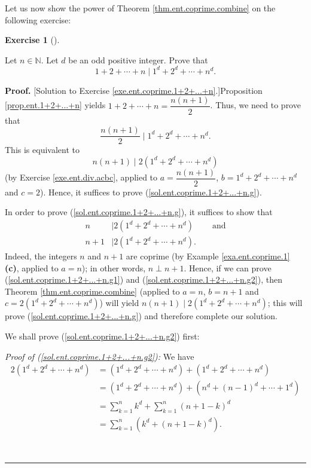 \documentclass[numbers=enddot,12pt,final,onecolumn,notitlepage]{scrartcl}%
\newcounter{exer}
\numberwithin{exer}{subsection}
\theoremstyle{definition}
\newtheorem{exmp}[exer]{Exercise}
\newenvironment{exercise}[1][]
{\begin{exmp}[#1]\begin{leftbar}}
{\end{leftbar}\end{exmp}}
\newenvironment{fineprint}{\begin{small}}{\end{small}}
\newenvironment{proof}[1][Proof]{\noindent\textbf{#1.} }{\ \rule{0.5em}{0.5em}}
\let\sumnonlimits\sum
\renewcommand{\sum}{\sumnonlimits\limits}
\begin{document}
Let us now show the power of Theorem \ref{thm.ent.coprime.combine} on the
following exercise:

\begin{exercise}
\label{exe.ent.coprime.1+2+...+n}Let $n\in\mathbb{N}$. Let $d$ be an odd
positive integer. Prove that%
\[
1+2+\cdots+n\mid1^{d}+2^{d}+\cdots+n^{d}.
\]

\end{exercise}

\begin{fineprint}
\begin{proof}
[Solution to Exercise \ref{exe.ent.coprime.1+2+...+n}.]Proposition
\ref{prop.ent.1+2+...+n} yields $1+2+\cdots+n=\dfrac{n\left(  n+1\right)  }%
{2}$. Thus, we need to prove that%
\[
\dfrac{n\left(  n+1\right)  }{2}\mid1^{d}+2^{d}+\cdots+n^{d}.
\]
This is equivalent to%
\begin{equation}
n\left(  n+1\right)  \mid2\left(  1^{d}+2^{d}+\cdots+n^{d}\right)
\label{sol.ent.coprime.1+2+...+n.g}%
\end{equation}
(by Exercise \ref{exe.ent.div.acbc}, applied to $a=\dfrac{n\left(  n+1\right)
}{2}$, $b=1^{d}+2^{d}+\cdots+n^{d}$ and $c=2$). Hence, it suffices to prove
(\ref{sol.ent.coprime.1+2+...+n.g}).

In order to prove (\ref{sol.ent.coprime.1+2+...+n.g}), it suffices to show
that%
\begin{align}
n  &  \mid2\left(  1^{d}+2^{d}+\cdots+n^{d}\right)
\ \ \ \ \ \ \ \ \ \ \text{and}\label{sol.ent.coprime.1+2+...+n.g1}\\
n+1  &  \mid2\left(  1^{d}+2^{d}+\cdots+n^{d}\right)  .
\label{sol.ent.coprime.1+2+...+n.g2}%
\end{align}
Indeed, the integers $n$ and $n+1$ are coprime (by Example
\ref{exa.ent.coprime.1} \textbf{(c)}, applied to $a=n$); in other words,
$n\perp n+1$. Hence, if we can prove (\ref{sol.ent.coprime.1+2+...+n.g1}) and
(\ref{sol.ent.coprime.1+2+...+n.g2}), then Theorem
\ref{thm.ent.coprime.combine} (applied to $a=n$, $b=n+1$ and $c=2\left(
1^{d}+2^{d}+\cdots+n^{d}\right)  $) will yield $n\left(  n+1\right)
\mid2\left(  1^{d}+2^{d}+\cdots+n^{d}\right)  $; this will prove
(\ref{sol.ent.coprime.1+2+...+n.g}) and therefore complete our solution.

We shall prove (\ref{sol.ent.coprime.1+2+...+n.g2}) first:

\textit{Proof of (\ref{sol.ent.coprime.1+2+...+n.g2}):} We have%
\begin{align}
2\left(  1^{d}+2^{d}+\cdots+n^{d}\right)   &  =\left(  1^{d}+2^{d}%
+\cdots+n^{d}\right)  +\left(  1^{d}+2^{d}+\cdots+n^{d}\right) \nonumber\\
&  =\left(  1^{d}+2^{d}+\cdots+n^{d}\right)  +\left(  n^{d}+\left(
n-1\right)  ^{d}+\cdots+1^{d}\right) \nonumber\\
&  =\sum_{k=1}^{n}k^{d}+\sum_{k=1}^{n}\left(  n+1-k\right)  ^{d}\nonumber\\
&  =\sum_{k=1}^{n}\left(  k^{d}+\left(  n+1-k\right)  ^{d}\right)  .
\label{sol.ent.coprime.1+2+...+n.5}%
\end{align}



\end{proof}
\end{fineprint}
\end{document}
